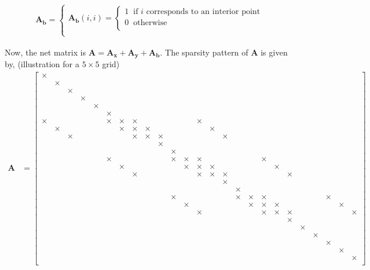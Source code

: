 \documentclass[12 pt, final]{article}
\renewcommand{\d}{\times}
\begin{document}
\begin{itemize}
\begin{itemize}
            \begin{align*}
                    \mathbf{A_b} = \begin{cases}
                    \mathbf{A_b}(i,i) =
                    \begin{cases}
                    1 \: \text{ if $i$ corresponds to an interior point}\:\\
                    0 \: \text{ otherwise}\:\\
                    \end{cases}\\
                    \end{cases}
            \end{align*}
 
            
            Now, the net matrix is $\mathbf{A} = \mathbf{A_x}+\mathbf{A_y}+\mathbf{A_b}$. The sparsity pattern of $\mathbf{A}$ is given by, (illustration for a $5\times5$ grid)
            \begin{align*}
                \mathbf{A} &= \left[\begin{smallmatrix} 
                \d\\
                & \d\\
                && \d\\
                &&& \d\\
                &&&& \d\\
                &&&&& \d\\
                 \d &&&&&\d& \d &\d&&&&& \d\\
                & \d &&&&&\d& \d &\d&&&&& \d\\
                && \d &&&&&\d& \d &\d&&&&& \d\\
                &&&&&&&&& \d\\
                &&&&&&&&&& \d\\
                &&&&& \d &&&&&\d& \d &\d&&&&& \d\\
                &&&&&& \d &&&&&\d& \d &\d&&&&& \d\\
                &&&&&&& \d &&&&&\d& \d &\d&&&&& \d\\
                &&&&&&&&&&&&&& \d\\
                &&&&&&&&&&&&&&& \d\\
                &&&&&&&&&& \d &&&&&\d& \d &\d&&&&& \d\\
                &&&&&&&&&&& \d &&&&&\d& \d &\d&&&&& \d\\
                &&&&&&&&&&&& \d &&&&&\d& \d &\d&&&&& \d\\
                &&&&&&&&&&&&&&&&&&& \d\\
                &&&&&&&&&&&&&&&&&&&& \d\\
                &&&&&&&&&&&&&&&&&&&&& \d\\
                &&&&&&&&&&&&&&&&&&&&&& \d\\
                &&&&&&&&&&&&&&&&&&&&&&& \d\\
                &&&&&&&&&&&&&&&&&&&&&&&& \d\\
                \end{smallmatrix}\right]
            \end{align*}
            

\end{itemize}
\end{itemize}
\end{document}
